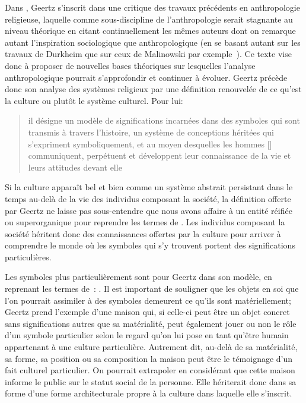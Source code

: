 Dans , Geertz s'inscrit dans une critique des travaux précédents en anthropologie religieuse, laquelle comme sous-discipline de l'anthropologie serait stagnante au niveau théorique en citant continuellement les mêmes auteurs dont on remarque autant l'inspiration sociologique que anthropologique (en se basant autant sur les travaux de Durkheim que sur ceux de Malinowski par exemple~\citep[20]{Geertz1972}). 
Ce texte vise donc à proposer de nouvelles bases théoriques sur lesquelles l'analyse anthropologique pourrait s'approfondir et continuer à évoluer. 
Geertz précède donc son analyse des systèmes religieux par une définition renouvelée de ce qu'est la culture ou plutôt le système culturel. 
Pour lui: \blockquote[{\cite[21]{Geertz1972}}][.]{\textelp{} il désigne un modèle de significations incarnées dans des symboles qui sont transmis à travers l'histoire, un système de conceptions héritées qui s'expriment symboliquement, et au moyen desquelles les hommes [] communiquent, perpétuent et développent leur connaissance de la vie et leurs attitudes devant elle}.

Si la culture apparaît bel et bien comme un système abstrait persistant dans le temps au-delà de la vie des individus composant la société, la définition offerte par Geertz ne laisse pas sous-entendre que nous avons affaire à un entité réifiée ou superorganique pour reprendre les termes de \citet{Duncan1980}. 
Les individus composant la société héritent donc des connaissances offertes par la culture pour arriver à comprendre le monde où les symboles qui s'y trouvent portent des significations particulières.

Les symboles plus particulièrement sont pour Geertz dans son modèle, en reprenant les termes de~\cite{Langer1962}: . 
Il est important de souligner que les objets en soi que l'on pourrait assimiler à des symboles demeurent ce qu'ils sont matériellement; Geertz prend l'exemple d'une maison qui, si celle-ci peut être un objet concret sans significations autres que sa matérialité, peut également jouer ou non le rôle d'un symbole particulier selon le regard qu'on lui pose en tant qu'être humain appartenant à une culture particulière. 
Autrement dit, au-delà de sa matérialité, sa forme, sa position ou sa composition la maison peut être le témoignage d'un fait culturel particulier. 
On pourrait extrapoler en considérant que cette maison informe le public sur le statut social de la personne. 
 Elle hériterait donc dans sa forme d'une forme architecturale propre à la culture dans laquelle elle s'inscrit.

